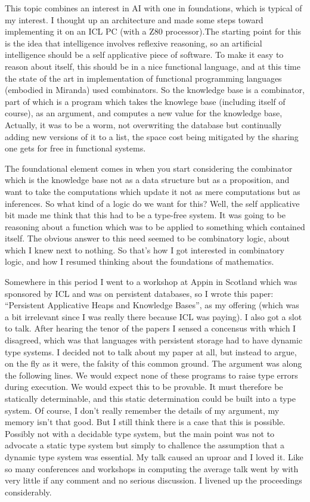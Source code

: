 \documentclass[10pt,titlepage]{book}
\begin{document}
This topic combines an interest in AI with one in foundations, which is typical of my interest.
I thought up an architecture and made some steps toward implementing it on an ICL PC (with a Z80 processor).The starting point for this is the idea that intelligence involves reflexive reasoning, so an artificial intelligence should be a self applicative piece of software.
To make it easy to reason about itself, this should be in a nice functional language, and at this time the state of the art in implementation of functional programming languages (embodied in Miranda) used combinators.
So the knowledge base is a combinator, part of which is a program which takes the knowlege base (including itself of course), as an argument, and computes a new value for the knowledge base,
Actually, it was to be a worm, not overwriting the database but continually adding new versions of it to a list, the space cost being mitigated by the sharing one gets for free in functional systems.

The foundational element comes in when you start considering the combinator which is the knowledge base not as a data structure but as a proposition, and want to take the computations which update it not as mere computations but as inferences.
So what kind of a logic do we want for this?
Well, the self applicative bit made me think that this had to be a type-free system.
It was going to be reasoning about a function which was to be applied to something which contained itself.
The obvious answer to this need seemed to be combinatory logic, about which I knew next to nothing.
So that's how I got interested in combinatory logic, and how I resumed thinking about the foundations of mathematics.

Somewhere in this period I went to a workshop at Appin in Scotland which was sponsored by ICL and was on persistent databases, so I wrote this paper:
``Persistent Applicative Heaps and Knowledge Bases'', as my offering (which was a bit irrelevant since I was really there because ICL was paying).
I also got a slot to talk.
After hearing the tenor of the papers I sensed a concensus with which I disagreed, which was that languages with persistent storage had to have dynamic type systems.
I decided not to talk about my paper at all, but instead to argue, on the fly as it were, the falsity of this common ground.
The argument was along the following lines.
We would expect none of these programs to raise type errors during execution.
We would expect this to be provable.
It must therefore be statically determinable, and this static determination could be built into a type system.
Of course, I don't really remember the details of my argument, my memory isn't that good.
But I still think there is a case that this is possible.
Possibly not with a decidable type system, but the main point was not to advocate a static type system but simply to challence the assumption that a dynamic type system was essential.
My talk caused an uproar and I loved it.
Like so many conferences and workshops in computing the average talk went by with very little if any comment and no serious discussion.
I livened up the proceedings considerably.
\end{document}
